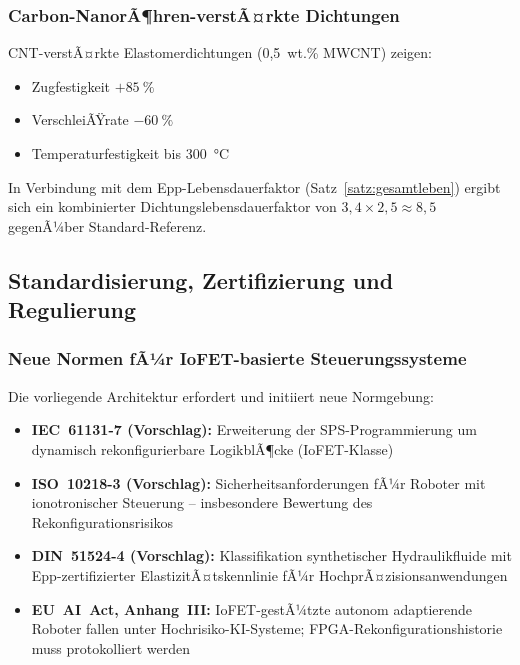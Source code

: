 ﻿\documentclass[a4paper,12pt]{scrreprt}
\theoremstyle{definition}
\begin{document}
\subsubsection{Carbon-NanorÃ¶hren-verstÃ¤rkte Dichtungen}

CNT-verstÃ¤rkte Elastomerdichtungen (0{,}5~wt.\% MWCNT) zeigen:
\begin{itemize}
  \item Zugfestigkeit $+\SI{85}{\percent}$
  \item VerschleiÃŸrate $-\SI{60}{\percent}$
  \item Temperaturfestigkeit bis \SI{300}{\celsius}
\end{itemize}
In Verbindung mit dem Epp-Lebensdauerfaktor (Satz~\ref{satz:gesamtleben})
ergibt sich ein kombinierter Dichtungslebensdauerfaktor von
$3{,}4 \times 2{,}5 \approx 8{,}5$ gegenÃ¼ber Standard-Referenz.

\subsection{Standardisierung, Zertifizierung und Regulierung}

\subsubsection{Neue Normen fÃ¼r IoFET-basierte Steuerungssysteme}

Die vorliegende Architektur erfordert und initiiert neue Normgebung:

\begin{itemize}
  \item \textbf{IEC~61131-7 (Vorschlag):} Erweiterung der SPS-Programmierung
        um dynamisch rekonfigurierbare LogikblÃ¶cke (IoFET-Klasse)
  \item \textbf{ISO~10218-3 (Vorschlag):} Sicherheitsanforderungen fÃ¼r
        Roboter mit ionotronischer Steuerung -- insbesondere Bewertung
        des Rekonfigurationsrisikos
  \item \textbf{DIN~51524-4 (Vorschlag):} Klassifikation synthetischer
        Hydraulikfluide mit Epp-zertifizierter ElastizitÃ¤tskennlinie
        fÃ¼r HochprÃ¤zisionsanwendungen
  \item \textbf{EU~AI~Act, Anhang~III:} IoFET-gestÃ¼tzte autonom
        adaptierende Roboter fallen unter Hochrisiko-KI-Systeme;
        FPGA-Rekonfigurationshistorie muss protokolliert werden
\end{itemize}
\end{document}
